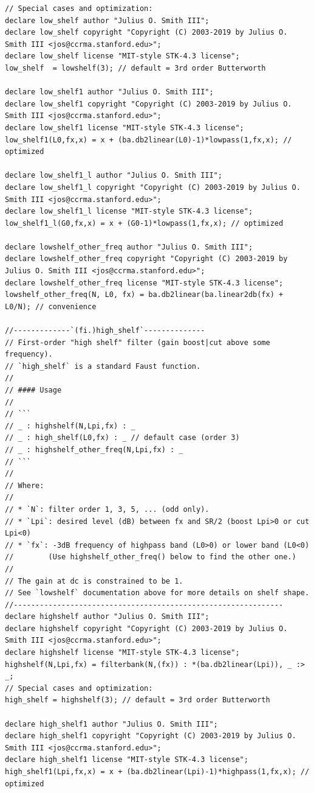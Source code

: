 \documentclass{article}
\begin{document}
\begin{lstlisting}[caption=\texttt{filters.lib}]
// Special cases and optimization:
declare low_shelf author "Julius O. Smith III";
declare low_shelf copyright "Copyright (C) 2003-2019 by Julius O. Smith III <jos@ccrma.stanford.edu>";
declare low_shelf license "MIT-style STK-4.3 license";
low_shelf  = lowshelf(3); // default = 3rd order Butterworth

declare low_shelf1 author "Julius O. Smith III";
declare low_shelf1 copyright "Copyright (C) 2003-2019 by Julius O. Smith III <jos@ccrma.stanford.edu>";
declare low_shelf1 license "MIT-style STK-4.3 license";
low_shelf1(L0,fx,x) = x + (ba.db2linear(L0)-1)*lowpass(1,fx,x); // optimized

declare low_shelf1_l author "Julius O. Smith III";
declare low_shelf1_l copyright "Copyright (C) 2003-2019 by Julius O. Smith III <jos@ccrma.stanford.edu>";
declare low_shelf1_l license "MIT-style STK-4.3 license";
low_shelf1_l(G0,fx,x) = x + (G0-1)*lowpass(1,fx,x); // optimized

declare lowshelf_other_freq author "Julius O. Smith III";
declare lowshelf_other_freq copyright "Copyright (C) 2003-2019 by Julius O. Smith III <jos@ccrma.stanford.edu>";
declare lowshelf_other_freq license "MIT-style STK-4.3 license";
lowshelf_other_freq(N, L0, fx) = ba.db2linear(ba.linear2db(fx) + L0/N); // convenience

//-------------`(fi.)high_shelf`--------------
// First-order "high shelf" filter (gain boost|cut above some frequency).
// `high_shelf` is a standard Faust function.
//
// #### Usage
//
// ```
// _ : highshelf(N,Lpi,fx) : _
// _ : high_shelf(L0,fx) : _ // default case (order 3)
// _ : highshelf_other_freq(N,Lpi,fx) : _
// ```
//
// Where:
//
// * `N`: filter order 1, 3, 5, ... (odd only).
// * `Lpi`: desired level (dB) between fx and SR/2 (boost Lpi>0 or cut Lpi<0)
// * `fx`: -3dB frequency of highpass band (L0>0) or lower band (L0<0)
//        (Use highshelf_other_freq() below to find the other one.)
//
// The gain at dc is constrained to be 1.
// See `lowshelf` documentation above for more details on shelf shape.
//--------------------------------------------------------------
declare highshelf author "Julius O. Smith III";
declare highshelf copyright "Copyright (C) 2003-2019 by Julius O. Smith III <jos@ccrma.stanford.edu>";
declare highshelf license "MIT-style STK-4.3 license";
highshelf(N,Lpi,fx) = filterbank(N,(fx)) : *(ba.db2linear(Lpi)), _ :> _;
// Special cases and optimization:
high_shelf = highshelf(3); // default = 3rd order Butterworth

declare high_shelf1 author "Julius O. Smith III";
declare high_shelf1 copyright "Copyright (C) 2003-2019 by Julius O. Smith III <jos@ccrma.stanford.edu>";
declare high_shelf1 license "MIT-style STK-4.3 license";
high_shelf1(Lpi,fx,x) = x + (ba.db2linear(Lpi)-1)*highpass(1,fx,x); // optimized


\end{lstlisting}
\end{document}
